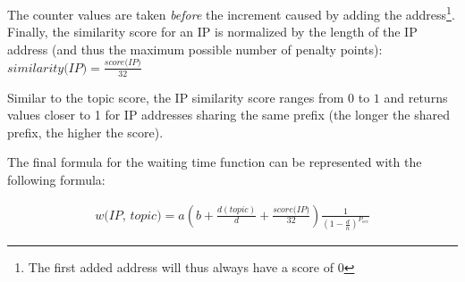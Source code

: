 The counter values are taken \emph{before} the increment caused by adding the address\footnote{The first added address will thus always have a score of $0$}. 
Finally, the similarity score for an IP is normalized by the length of the IP address (and thus the maximum possible number of penalty points): $\textit{similarity(IP}) = \frac{\textit{score(IP)}}{32}$

Similar to the topic score, the IP similarity score ranges from $0$ to $1$ and returns values closer to 1 for IP addresses sharing the same prefix (the longer the shared prefix, the higher the score).

The final formula for the waiting time function can be represented with the following formula:%

\begin{equation}
\begin{split}
    \textit{w(IP, topic)} = 
    a(b + \frac{d(\textit{topic})}{d} + \frac{\textit{score(IP)}}{32}
    )
    \frac{1}{(1-\frac{d}{n})^{P_\textit{occ}}}
\end{split}
\end{equation}




